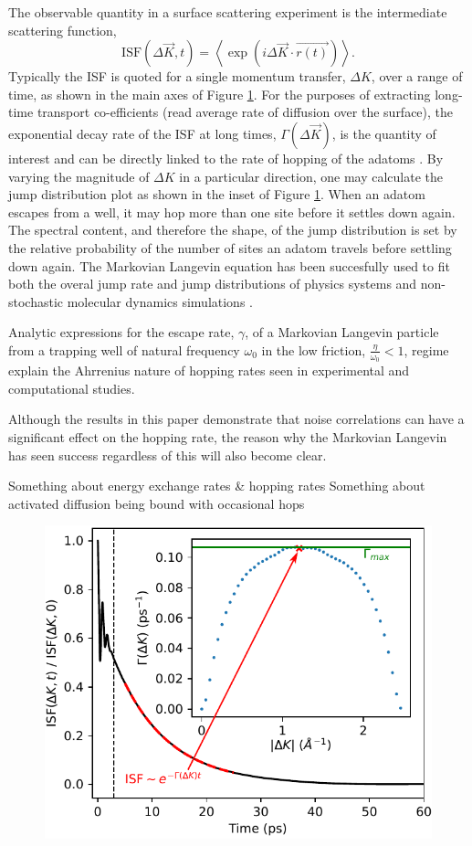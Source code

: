 \documentclass[7pt]{article}
\begin{document}
The observable quantity in a surface scattering experiment is the intermediate scattering function,
$$
\mathrm{ISF}(\Delta{\vec{K}}, t) = \left<\exp\left(i\Delta{\vec{K}}\cdot\vec{r(t)}\right)\right>.
$$
Typically the ISF is quoted for a single momentum transfer, $\Delta{K}$, over a range of time, as shown in the main axes of Figure \ref{fig:isf_dk}. For the purposes of extracting long-time transport co-efficients (read average rate of diffusion over the surface), the exponential decay rate of the ISF at long times, $\Gamma(\Delta{\vec{K}})$, is the quantity of interest and can be directly linked to the rate of hopping of the adatoms \cite{Chudley}. By varying the magnitude of $\Delta{K}$ in a particular direction, one may calculate the jump distribution plot as shown in the inset of Figure \ref{fig:isf_dk}. When an adatom escapes from a well, it may hop more than one site before it settles down again. The spectral content, and therefore the shape, of the jump distribution is set by the relative probability of the number of sites an adatom travels before settling down again. The Markovian Langevin equation has been succesfully used to fit both the overal jump rate and jump distributions of physics systems \cite{Alexandrowicz, Hedgeland, Jardine} and non-stochastic molecular dynamics simulations \cite{Diamant}. 

Analytic expressions for the escape rate, $\gamma$, of a Markovian Langevin particle from a trapping well of natural frequency $\omega_0$ in the low friction, $\frac{\eta}{\omega_0} < 1$, regime explain the Ahrrenius nature of hopping rates seen in experimental and computational studies. 

Although the results in this paper demonstrate that noise correlations can have a significant effect on the hopping rate, the reason why the Markovian Langevin has seen success regardless of this will also become clear.

Something about energy exchange rates \& hopping rates
Something about activated diffusion being bound with occasional hops

\begin{figure}
	\centering
	\includegraphics{isf_dk}
	\caption{}
	\label{fig:isf_dk}
\end{figure}
\end{document}
